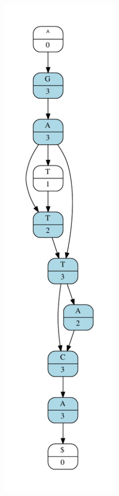 \documentclass[serif,11pt]{beamer}
\begin{document}
\begin{frame}
\begin{columns}
\begin{column}{0.4\textwidth}
    \includegraphics[width=0.45\textwidth]{./img/small-poa.pdf}
\end{column}
\end{columns}
\end{frame}
\end{document}
